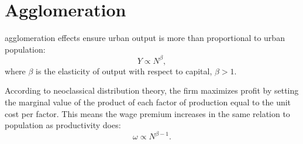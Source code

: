 \section{Agglomeration}

 \Glspl{agglomeration effect} ensure urban \gls{output} is more than proportional to urban population: 
 \begin{equation}
 Y\propto N^{\beta},
 \label{eqn-production-population}
 \end{equation}
where $\beta$ is the elasticity of output with respect to capital,  $\beta >1$.   

According to \gls{neoclassical distribution theory}, the firm maximizes profit by setting the marginal value of the product of each \gls{factor of production} equal to the unit cost per factor. This means the wage premium increases in the same relation to population as \gls{productivity} does:
\begin{equation}
\omega\propto N^{\beta-1}.
\label{eqn-wage-population}
\end{equation}



 
